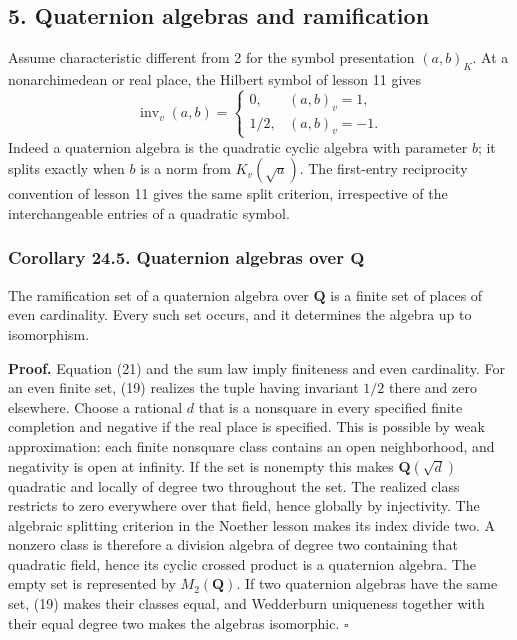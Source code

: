 \documentclass[11pt,a4paper]{article}
\begin{document}
\subsection{5. Quaternion algebras and
ramification}\label{quaternion-algebras-and-ramification}

Assume characteristic different from 2 for the symbol presentation
\((a,b)_K\). At a nonarchimedean or real place, the Hilbert symbol of
lesson 11 gives \[
\operatorname{inv}_v(a,b)=
\begin{cases}0,&(a,b)_v=1,\\[2pt]1/2,&(a,b)_v=-1.\end{cases}
\tag{21}
\] Indeed a quaternion algebra is the quadratic cyclic algebra with
parameter \(b\); it splits exactly when \(b\) is a norm from
\(K_v(\sqrt a)\). The first-entry reciprocity convention of lesson 11
gives the same split criterion, irrespective of the interchangeable
entries of a quadratic symbol.

\subsubsection{\texorpdfstring{Corollary 24.5. Quaternion algebras over
\(\mathbf Q\)}{Corollary 24.5. Quaternion algebras over \textbackslash mathbf Q}}\label{corollary-24.5.-quaternion-algebras-over-mathbf-q}

The ramification set of a quaternion algebra over \(\mathbf Q\) is a
finite set of places of even cardinality. Every such set occurs, and it
determines the algebra up to isomorphism.

\textbf{Proof.} Equation (21) and the sum law imply finiteness and even
cardinality. For an even finite set, (19) realizes the tuple having
invariant \(1/2\) there and zero elsewhere. Choose a rational \(d\) that
is a nonsquare in every specified finite completion and negative if the
real place is specified. This is possible by weak approximation: each
finite nonsquare class contains an open neighborhood, and negativity is
open at infinity. If the set is nonempty this makes
\(\mathbf Q(\sqrt d)\) quadratic and locally of degree two throughout
the set. The realized class restricts to zero everywhere over that
field, hence globally by injectivity. The algebraic splitting criterion
in the Noether lesson makes its index divide two. A nonzero class is
therefore a division algebra of degree two containing that quadratic
field, hence its cyclic crossed product is a quaternion algebra. The
empty set is represented by \(M_2(\mathbf Q)\). If two quaternion
algebras have the same set, (19) makes their classes equal, and
Wedderburn uniqueness together with their equal degree two makes the
algebras isomorphic. \(\square\)
\end{document}

